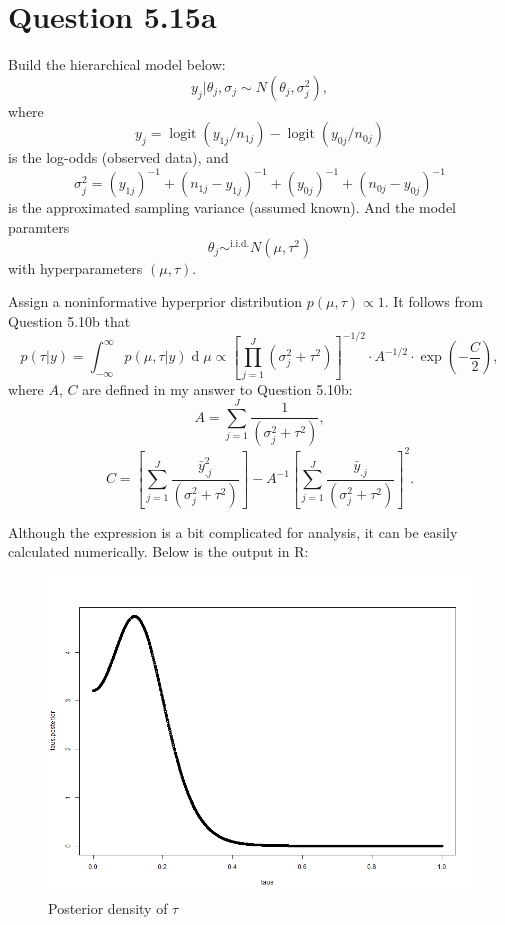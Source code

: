 \documentclass{article}
\DeclareMathOperator*{\logit}{logit}
\DeclareMathOperator*{\deriv}{d}
\begin{document}
\section*{Question 5.15a}
{
    Build the hierarchical model below:
    $$y_j | \theta_j, \sigma_j \sim N(\theta_j, \sigma_j^2),$$
    where $$y_j = \logit{(y_{1j} / n_{1j})} - \logit{(y_{0j} / n_{0j})}$$ is the log-odds (observed data), and $$\sigma_j^2 = (y_{1j})^{-1} + (n_{1j} - y_{1j})^{-1} + (y_{0j})^{-1} + (n_{0j} - y_{0j})^{-1}$$ is the approximated sampling variance (assumed known). And the model paramters $$\theta_j \sim^{\mathrm{i.i.d.}} N(\mu, \tau^2)$$ with hyperparameters $(\mu, \tau)$.

    Assign a noninformative hyperprior distribution $p(\mu, \tau) \propto 1$. It follows from Question 5.10b that
    $$p(\tau | y) = \int_{-\infty}^{\infty} {p(\mu, \tau | y) \deriv{\mu}} \propto \left[ \prod_{j=1}^{J} {(\sigma_j^2 + \tau^2)} \right]^{-1/2} \cdot A^{-1/2} \cdot \exp{(-\frac{C}{2})},$$ where $A$, $C$ are defined in my answer to Question 5.10b:
    $$A = \sum_{j=1}^{J} {\frac{1}{(\sigma_j^2 + \tau^2)}},$$
    $$C = \left[ \sum_{j=1}^{J} {\frac{\bar{y}_{.j}^2}{(\sigma_j^2 + \tau^2)}} \right] - A^{-1} \left[ \sum_{j=1}^{J} {\frac{\bar{y}_{.j}}{(\sigma_j^2 + \tau^2)}} \right]^2 .$$

    Although the expression is a bit complicated for analysis, it can be easily calculated numerically. Below is the output in R:
    \begin{figure}[H]
        \centering
        \includegraphics[width = 0.8\linewidth]{tau.posterior.png}
        \caption{Posterior density of $\tau$}
    \end{figure}

}
\end{document}
